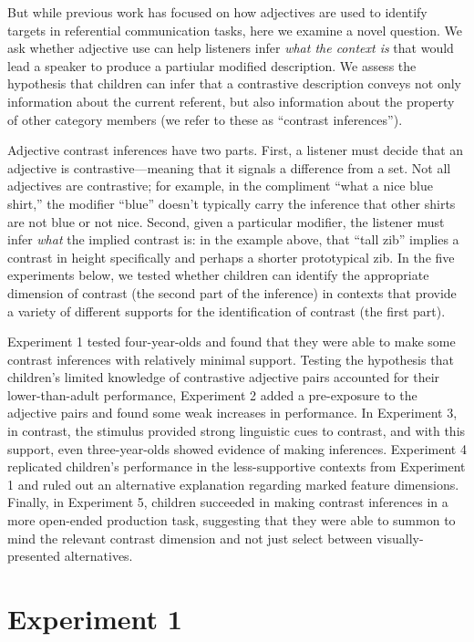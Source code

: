 \documentclass[man]{apa2}
\begin{document}
But while previous work has focused on how adjectives are used to identify targets in referential communication tasks, here we examine a novel question. We ask whether adjective use can help listeners infer \emph{what the context is} that would lead a speaker to produce a partiular modified description. We assess the hypothesis that children can infer that a contrastive description conveys not only information about the current referent, but also information about the property of other category members (we refer to these as ``contrast inferences'').  

Adjective contrast inferences have two parts. First, a listener must decide that an adjective is contrastive---meaning that it signals a difference from a set. Not all adjectives are contrastive; for example, in the compliment ``what a nice blue shirt,'' the modifier ``blue''  doesn't typically carry the inference that other shirts are not blue or not nice. Second, given a particular modifier, the listener must infer \emph{what} the implied contrast is: in the example above, that ``tall zib'' implies a contrast in height specifically and perhaps a shorter prototypical zib. In the five experiments below, we tested whether children can identify the appropriate dimension of contrast (the second part of the inference) in contexts that provide a variety of different supports for the identification of contrast (the first part). 

Experiment 1 tested four-year-olds and found that they were able to make some contrast inferences with relatively minimal support. Testing the hypothesis that children's limited knowledge of contrastive adjective pairs accounted for their lower-than-adult performance, Experiment 2 added a pre-exposure to the adjective pairs and found some weak increases in performance. In Experiment 3, in contrast, the stimulus provided strong linguistic cues to contrast, and with this support, even three-year-olds showed evidence of making inferences. Experiment 4 replicated children's performance in the less-supportive contexts from Experiment 1 and ruled out an alternative explanation regarding marked feature dimensions. Finally, in Experiment 5, children succeeded in making contrast inferences in a more open-ended production task, suggesting that they were able to summon to mind the relevant contrast dimension and not just select between visually-presented alternatives. 

\section{Experiment 1}
\end{document}
